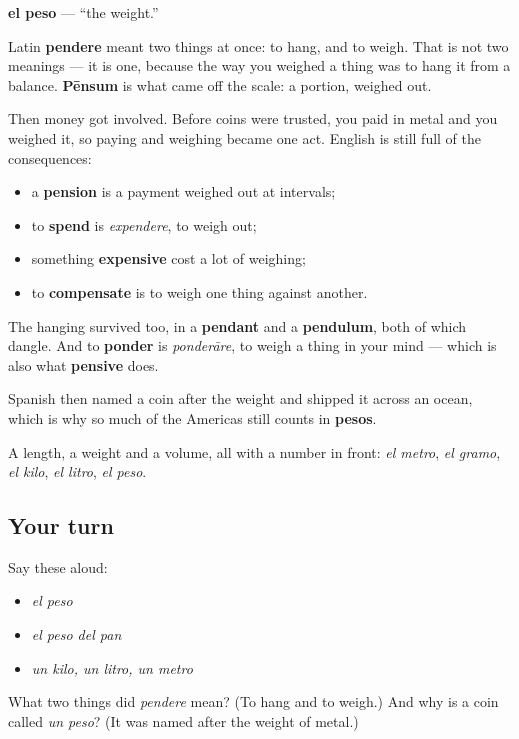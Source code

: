 \begin{cousinweb}
\textbf{el peso} — \textquotedblleft{}the weight.\textquotedblright{}

Latin \textbf{pendere} meant two things at once: to hang, and to weigh. That is not two meanings — it is one, because the way you weighed a thing was to hang it from a balance. \textbf{Pēnsum} is what came off the scale: a portion, weighed out.

Then money got involved. Before coins were trusted, you paid in metal and you weighed it, so paying and weighing became one act. English is still full of the consequences:

\begin{itemize}
\raggedright
  \item a \textbf{pension} is a payment weighed out at intervals;
  \item to \textbf{spend} is \emph{expendere}, to weigh out;
  \item something \textbf{expensive} cost a lot of weighing;
  \item to \textbf{compensate} is to weigh one thing against another.
\end{itemize}

The hanging survived too, in a \textbf{pendant} and a \textbf{pendulum}, both of which dangle. And to \textbf{ponder} is \emph{ponderāre}, to weigh a thing in your mind — which is also what \textbf{pensive} does.

Spanish then named a coin after the weight and shipped it across an ocean, which is why so much of the Americas still counts in \textbf{pesos}.
\end{cousinweb}

\begin{grammarlens}[title={What you've built}]
A length, a weight and a volume, all with a number in front: \emph{el metro}, \emph{el gramo}, \emph{el kilo}, \emph{el litro}, \emph{el peso}.
\end{grammarlens}

\subsection*{Your turn}
Say these aloud:

\begin{itemize}
\raggedright
  \item \emph{el peso}
  \item \emph{el peso del pan}
  \item \emph{un kilo, un litro, un metro}
\end{itemize}

\begin{tcolorbox}[breakable,colback=teal!4,colframe=teal!35!black,title={Before you move on}]
What two things did \emph{pendere} mean? (To hang and to weigh.) And why is a coin called \emph{un peso}? (It was named after the weight of metal.)
\end{tcolorbox}
